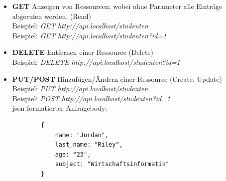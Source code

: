 \begin{itemize}
    \item \textbf{GET} Anzeigen von Ressourcen; wobei ohne Parameter alle Einträge abgerufen werden. (Read) \\
    Beispiel: \textit{GET http://api.localhost/studenten} \\
    Beispiel: \textit{GET http://api.localhost/studenten?id=1}
    \item \textbf{DELETE} Entfernen einer Ressource (Delete) \\
    Beispiel: \textit{DELETE http://api.localhost/studenten?id=1}
    \item \textbf{PUT/POST} Hinzufügen/Ändern einer Ressource (Create, Update) \\
    Beispiel: \textit{PUT http://api.localhost/studenten} \\
    Beispiel: \textit{POST http://api.localhost/studenten?id=1} \\
    \gls{json} formatierter Anfragebody: 
    \begin{verbatim}
        {
            name: "Jordan",
            last_name: "Riley",
            age: "23",
            subject: "Wirtschaftsinformatik"
        }
    \end{verbatim}
\end{itemize}

